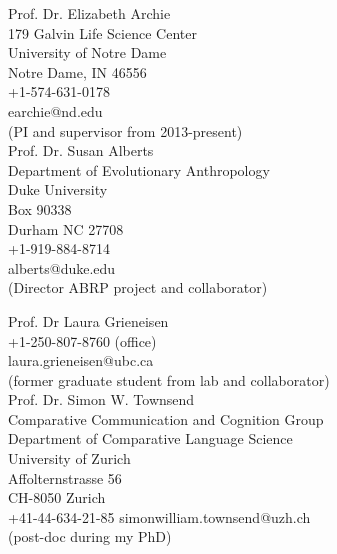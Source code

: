 \begin{minipage}[t]{0.5\textwidth} %


Prof. Dr. Elizabeth Archie \\
179 Galvin Life Science Center \\
University of Notre Dame \\
Notre Dame, IN 46556\\
+1-574-631-0178\\
earchie@nd.edu\\
(PI and supervisor from 2013-present)\\

Prof. Dr. Susan Alberts\\
Department of Evolutionary Anthropology\\
Duke University\\
Box 90338\\
Durham NC 27708\\
+1-919-884-8714\\
alberts@duke.edu\\
(Director ABRP project and collaborator)\\

\end{minipage} %
\begin{minipage}[t]{0.5\textwidth} %

Prof. Dr Laura Grieneisen\\
+1-250-807-8760 (office)\\
laura.grieneisen@ubc.ca\\
(former graduate student from lab and collaborator)\\

Prof. Dr. Simon W. Townsend\\
Comparative Communication and Cognition Group\\
Department of Comparative Language Science\\
University of Zurich\\
Affolternstrasse 56\\
CH-8050 Zurich\\
 +41-44-634-21-85
simonwilliam.townsend@uzh.ch\\
(post-doc during my PhD)\\
\end{minipage} %
